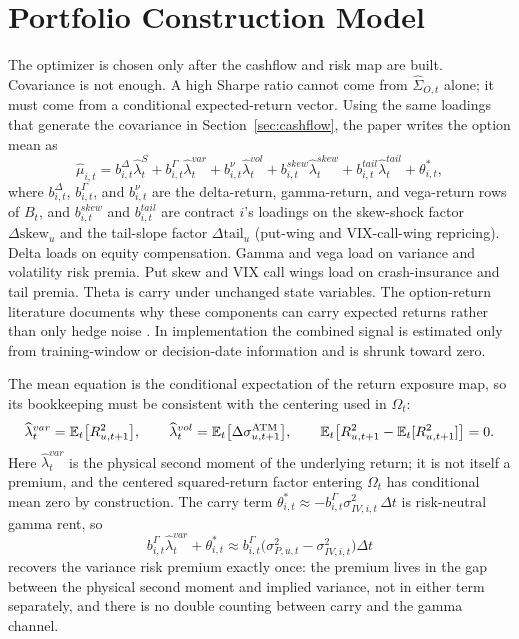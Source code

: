 \section{Portfolio Construction Model}\label{sec:portfolio}

The optimizer is chosen only after the cashflow and risk map are built. Covariance is not
enough. A high Sharpe ratio cannot come from \(\widehat\Sigma_{O,t}\) alone; it must come
from a conditional expected-return vector. Using the same loadings that generate the
covariance in Section~\ref{sec:cashflow}, the paper writes the option mean as
\[
\widehat\mu_{i,t}
=
 b^\Delta_{i,t}\widehat\lambda^{S}_t
+b^\Gamma_{i,t}\widehat\lambda^{var}_t
+b^\nu_{i,t}\widehat\lambda^{vol}_t
+b^{skew}_{i,t}\widehat\lambda^{skew}_t
+b^{tail}_{i,t}\widehat\lambda^{tail}_t
+\theta^{\ast}_{i,t},
\]
where \(b^\Delta_{i,t}\), \(b^\Gamma_{i,t}\), and \(b^\nu_{i,t}\) are the delta-return,
gamma-return, and vega-return rows of \(B_t\), and \(b^{skew}_{i,t}\) and
\(b^{tail}_{i,t}\) are contract \(i\)'s loadings on the skew-shock factor
\(\Delta\mathrm{skew}_u\) and the tail-slope factor \(\Delta\mathrm{tail}_u\) (put-wing and
VIX-call-wing repricing). Delta loads on equity compensation. Gamma and vega load on
variance and volatility risk premia. Put skew and VIX call wings load on crash-insurance
and tail premia. Theta is carry under unchanged state variables. The option-return
literature documents why these components can carry expected returns rather than only
hedge noise \citep{coval_shumway2001,bakshi_kapadia2003,carr_wu2009,
bollerslev_tauchen_zhou2009,broadie_chernov_johannes2009}. In implementation the combined
signal is estimated only from training-window or decision-date information and is shrunk
toward zero.

The mean equation is the conditional expectation of the return exposure map, so its
bookkeeping must be consistent with the centering used in \(\Omega_t\):
\[
  \widehat\lambda^{var}_t=\mathbb{E}_t\bigl[R_{u,t+1}^{2}\bigr],\qquad
  \widehat\lambda^{vol}_t=\mathbb{E}_t\bigl[\Delta\sigma^{\mathrm{ATM}}_{u,t+1}\bigr],\qquad
  \mathbb{E}_t\bigl[R_{u,t+1}^{2}-\mathbb{E}_t[R_{u,t+1}^{2}]\bigr]=0.
\]
Here \(\widehat\lambda^{var}_t\) is the physical second moment of the underlying return; it
is not itself a premium, and the centered squared-return factor entering \(\Omega_t\) has
conditional mean zero by construction. The carry term
\(\theta^{\ast}_{i,t}\approx-b^\Gamma_{i,t}\sigma^{2}_{IV,i,t}\,\Delta t\) is risk-neutral
gamma rent, so
\[
  b^\Gamma_{i,t}\widehat\lambda^{var}_t+\theta^{\ast}_{i,t}
  \approx b^\Gamma_{i,t}\bigl(\sigma^{2}_{P,u,t}-\sigma^{2}_{IV,i,t}\bigr)\Delta t
\]
recovers the variance risk premium exactly once: the premium lives in the gap between the
physical second moment and implied variance, not in either term separately, and there is
no double counting between carry and the gamma channel.

